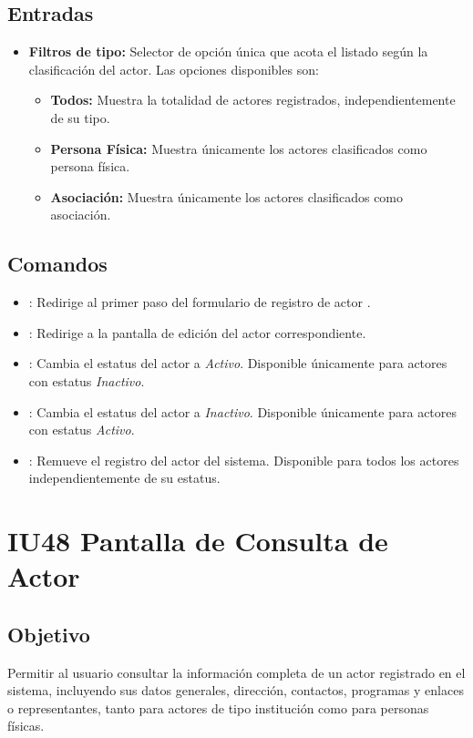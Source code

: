 \subsection{Entradas}
\begin{itemize}
	\item \textbf{Filtros de tipo:} Selector de opción única que acota el 
	listado según la clasificación del actor. Las opciones disponibles son:
	\begin{itemize}
		\item \textbf{Todos:} Muestra la totalidad de actores registrados, 
		independientemente de su tipo.
		\item \textbf{Persona Física:} Muestra únicamente los actores 
		clasificados como persona física.
		\item \textbf{Asociación:} Muestra únicamente los actores clasificados 
		como asociación.
	\end{itemize}
\end{itemize}

\subsection{Comandos}
\begin{itemize}
	\item {}: Redirige al primer paso del formulario de 
	registro de actor .
	\item {}: Redirige a la pantalla de edición del actor 
	correspondiente.
	\item {}: Cambia el estatus del actor a \textit{Activo}. 
	Disponible únicamente para actores con estatus \textit{Inactivo}.
	\item {}: Cambia el estatus del actor a 
	\textit{Inactivo}. Disponible únicamente para actores con estatus 
	\textit{Activo}.
	\item {}: Remueve el registro del actor del sistema. 
	Disponible para todos los actores independientemente de su estatus.
\end{itemize}


\section{IU48 Pantalla de Consulta de Actor}
\subsection{Objetivo}
Permitir al usuario consultar la información completa de un actor registrado en 
el sistema, incluyendo sus datos generales, dirección, contactos, programas y 
enlaces o representantes, tanto para actores de tipo institución como para 
personas físicas.

